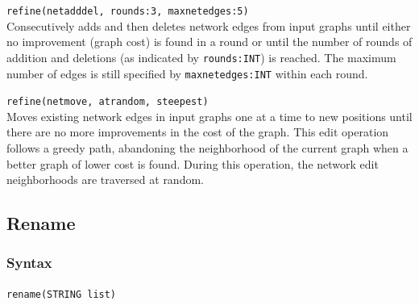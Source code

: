 	\begin{example}
	
		\item{\texttt{refine(netadddel, rounds:3, maxnetedges:5)}\\
		 Consecutively adds and then deletes network edges from input graphs until 
		 either no improvement (graph cost) is found in a round or until the number of 
		 rounds of addition and deletions (as indicated by \texttt{rounds:INT}) is reached. 
		 The maximum number of edges is still specified by \texttt{maxnetedges:INT} 
		 within each round.}
		
		\item{\texttt{refine(netmove, atrandom, steepest)} \\ Moves existing network 
		edges in input graphs one at a time to new positions until there are no more 
		improvements in the cost of the graph. This edit operation follows a greedy 
		path, abandoning the neighborhood of the current graph when a better graph
		of lower cost is found. During this operation, the network edit neighborhoods
		are traversed at random. }
		
		
		
	\end{example}
	
\subsection{Rename}
	\label{subsec:Rename}
	\subsubsection{Syntax}
		\texttt{rename(STRING list)}
		
